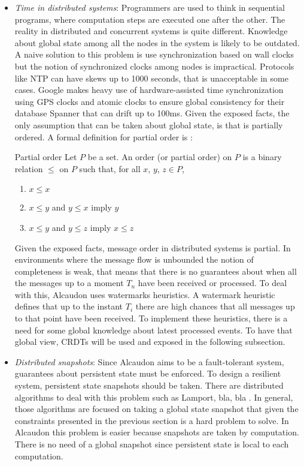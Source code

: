 \begin{itemize}
\item \textit{Time in distributed systems}:
  Programmers are used to think in sequential programs, where computation steps
  are executed one after the other. The reality in distributed and concurrent
  systems is quite different. Knowledge about global state among all the nodes
  in the system is likely to be outdated. A naive solution to this problem is
  use synchronization based on wall clocks but the notion of synchronized clocks
  among nodes is impractical. Protocols like NTP\cite{ntp} can have skews up to
  1000 seconds, that is unacceptable in some cases. Google makes heavy use of
  hardware-assisted time synchronization using GPS clocks and atomic clocks to
  ensure global consistency for their database Spanner\cite{180268} that can
  drift up to 100ms. Given the exposed facts, the only assumption that can be
  taken about global state, is that is partially ordered. A formal definition for
  partial order is \cite{book:lattices}:
\begin{definition}{Partial order}
  Let $P$ be a set. An order (or partial order) on $P$ is a binary relation
  $\leq$ on $P$ such that, for all $x$, $y$, $z \in P$,
  \begin{enumerate}
  \item $x \leq x$
  \item $x \leq y$ and $y \leq x$ imply $y$
  \item $x \leq y$ and $y \leq z$ imply $x \leq z$
  \end{enumerate}
\end{definition}
  Given the exposed facts, message order in distributed systems is partial. In
  environments where the message flow is unbounded the notion of completeness is
  weak, that means that there is no guarantees about when all the messages up to
  a moment $T_n$ have been received or processed. To deal with this, Alcaudon
  uses watermarks heuristics. A watermark heuristic defines that up to the
  instant $T_i$ there are high chances that all messages up to that point have
  been received. To implement these heuristics, there is a need for some global
  knowledge about latest processed events. To have that global view,
  CRDTs\cite{crdt} will be used and exposed in the following subsection.
\item \textit{Distributed snapshots}: 
  Since Alcaudon aims to be a fault-tolerant system, guarantees about persistent
  state must be enforced. To design a resilient system, persistent state
  snapshots should be taken. There are distributed algorithms to deal with this
  problem such as Lamport, bla, bla . In general, those algorithms are focused
  on taking a global state snapshot that given the constraints presented in the
  previous section is a hard problem to solve. In Alcaudon this problem is
  easier because snapshots are taken by computation. There is no need of a
  global snapshot since persistent state is local to each computation.


\end{itemize}
